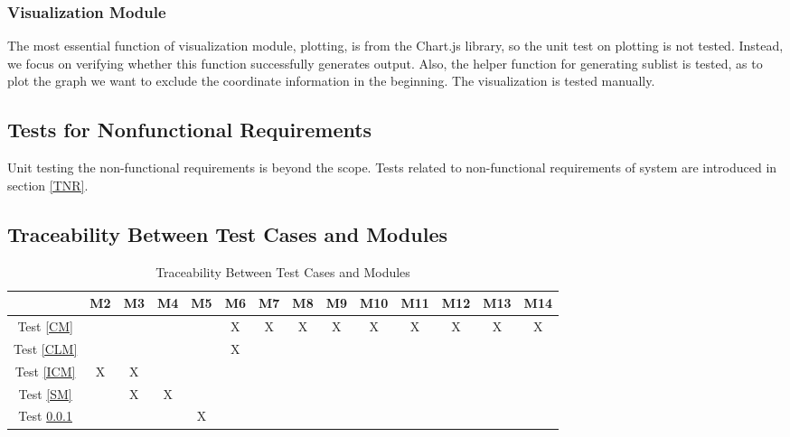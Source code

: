 \documentclass[12pt, titlepage]{article}
\begin{document}
\subsubsection{Visualization Module} \label{VM}
The most essential function of visualization module, plotting, is from the Chart.js library, so the unit test on plotting is not tested. Instead, we focus on verifying whether this function successfully generates output. Also, the helper function for generating sublist is tested, as to plot the graph we want to exclude the coordinate information in the beginning. The visualization is tested manually.


\subsection{Tests for Nonfunctional Requirements}
Unit testing the non-functional requirements is beyond the scope. Tests related to non-functional requirements of system are introduced in section \ref{TNR}.

\subsection{Traceability Between Test Cases and Modules}

\begin{table}[h]
\centering
\begin{tabular}{|c|c|c|c|c|c|c|c|c|c|c|c|c|c|}
\hline
	& M2 & M3 & M4  & M5 & M6 & M7 & M8 & M9 & M10 & M11 & M12 & M13 & M14 \\
\hline

Test \ref{CM}    & &  &  &  & X & X & X & X & X & X & X & X & X \\ \hline
Test \ref{CLM} &  &  &  &  & X  &  & &  &  &  &  &  & \\ \hline
Test \ref{ICM} & X & X &  &  &  &  & &  &  &  &  &  & \\ \hline
Test \ref{SM} & & X & X &  &  &  & &  &  &  &  &  & \\ \hline
Test \ref{VM} & &  &  & X &  &  & &  &  &  &  &  & \\ \hline

\end{tabular}
\caption{Traceability Between Test Cases and Modules}
\label{Table:test_modules}
\end{table}

				
%
\end{document}
